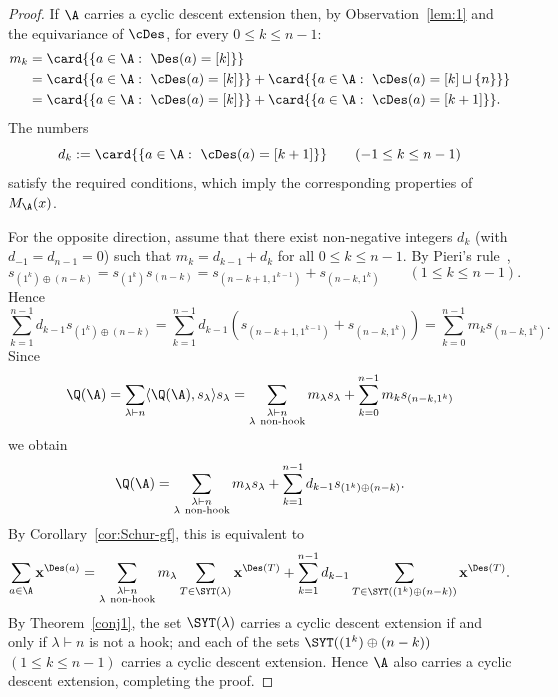 \begin{proof}
    If $\A$ carries a cyclic descent extension then, by Observation~\ref{lem:1} and the equivariance of $\cDes$, for every $0 \le k \le n-1$:
    \begin{align*}
        m_k
        &= \card{\{a\in \A:\ \Des(a)=[k]\}} \\
        &= \card{\{a\in \A:\ \cDes(a)=[k]\}}+\card{\{a\in \A:\ \cDes(a)=[k]\sqcup\{n\}\}} \\
        &= \card{\{a\in \A:\ \cDes(a)=[k]\}}+\card{\{a\in \A:\ \cDes(a)=[k+1]\}}.
    \end{align*}
    The numbers
    \[
        d_k := \card{\{a\in \A:\ \cDes(a)=[k+1]\}}
        \qquad (-1 \le k \le n-1)
    \]
    satisfy the required conditions,
    which imply the corresponding properties of $M_\A(x)$.

    For the opposite direction, assume that
    there exist non-negative integers $d_k$ (with $d_{-1} = d_{n-1} = 0$)
    such that $m_k=d_{k-1}+d_k$ for all $0\le k\le n-1$. 
    By Pieri's rule~\cite[Theorem 7.15.7]{EC2}, 
    \[
        s_{(1^k) \oplus (n-k)}=s_{(1^k)} s_{(n-k)}=s_{(n-k+1,1^{k-1})}+s_{(n-k,1^k)}
        \qquad (1 \le k \le n-1).
    \]
    Hence
    \[
        \sum_{k=1}^{n-1} d_{k-1} s_{(1^k)\oplus (n-k)} 
        = \sum_{k=1}^{n-1} d_{k-1} (s_{(n-k+1,1^{k-1})}+s_{(n-k,1^k)})
        =\sum_{k=0}^{n-1} m_k s_{(n-k,1^k)}. 
    \]
    Since
    \[
        \Q(\A) 
        = \sum_{\lambda \vdash n} \langle \Q(\A), s_\lambda \rangle s_\lambda 
        = \sum_{\substack{\lambda\vdash n \\ \lambda \ \text{non-hook}}} m_\lambda s_\lambda +
        \sum_{k=0}^{n-1} m_k s_{(n-k,1^k)}
    \]
    we obtain
    \begin{equation}\label{eq:q}
        \Q(\A) 
        = \sum_{\substack{\lambda\vdash n \\ \lambda \ \text{non-hook}}} m_\lambda s_\lambda +
        \sum_{k=1}^{n-1} d_{k-1} s_{(1^k)\oplus (n-k)}.
    \end{equation}
    By Corollary~\ref{cor:Schur-gf}, this is equivalent to
    \[
        \sum_{a\in \A} {\bf x}^{\Des(a)} = \sum_{\substack{\lambda\vdash n \\ \lambda\ \text{non-hook}}} m_\lambda 
        \sum_{T\in \SYT(\lambda)} {\bf x}^{\Des(T)} + 	\sum_{k=1}^{n-1} d_{k-1}
        \sum_{T \in \SYT((1^k)\oplus (n-k))} {\bf x}^{\Des(T)}.
    \]
    By Theorem~\ref{conj1},  
    the set $\SYT(\lambda)$ carries a cyclic descent extension if and only if $\lambda \vdash n$ is not a hook; 
    and each of the sets $\SYT((1^k)\oplus (n-k))$ $(1 \le k \le n-1)$ carries a cyclic descent extension. 
    Hence $\A$ also carries a cyclic descent extension, completing the proof. 
\end{proof}

